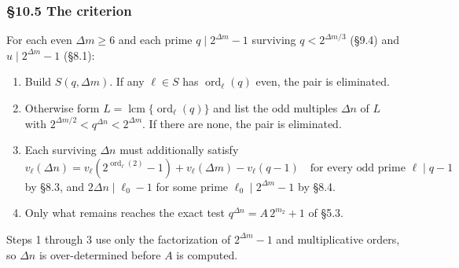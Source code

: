 \documentclass[11pt]{article}
\begin{document}
\subsubsection*{\S10.5 The criterion}

For each even $\Delta m \geq 6$ and each prime $q \mid 2^{\Delta m}-1$ surviving $q < 2^{\Delta m/3}$ (\S9.4) and $u \mid 2^{\Delta m}-1$ (\S8.1):
\begin{enumerate}
\item Build $S(q,\Delta m)$. If any $\ell \in S$ has $\operatorname{ord}_\ell(q)$ even, the pair is eliminated.
\item Otherwise form $L = \operatorname{lcm}\{\operatorname{ord}_\ell(q)\}$ and list the odd multiples $\Delta n$ of $L$ with $2^{\Delta m/2} < q^{\Delta n} < 2^{\Delta m}$. If there are none, the pair is eliminated.
\item Each surviving $\Delta n$ must additionally satisfy
\[
v_\ell(\Delta n) = v_\ell\!\left(2^{\operatorname{ord}_\ell(2)}-1\right) + v_\ell(\Delta m) - v_\ell(q-1) \quad \text{for every odd prime } \ell \mid q-1
\]
by \S8.3, and $2\Delta n \mid \ell_0 - 1$ for some prime $\ell_0 \mid 2^{\Delta m}-1$ by \S8.4.
\item Only what remains reaches the exact test $q^{\Delta n} = A\,2^{m_2}+1$ of \S5.3.
\end{enumerate}
Steps 1 through 3 use only the factorization of $2^{\Delta m}-1$ and multiplicative orders, so $\Delta n$ is over-determined before $A$ is computed.
\end{document}

